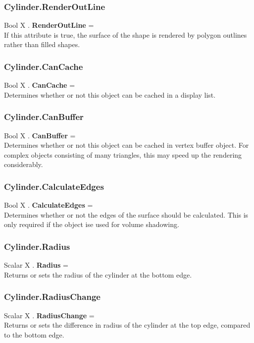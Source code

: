 \subsubsection{Cylinder.RenderOutLine \label{F:Cylinder:RenderOutLine}}
Bool X . \textbf{RenderOutLine} = \\
If this attribute is true, the surface of the shape is rendered by polygon outlines rather than filled shapes.

\subsubsection{Cylinder.CanCache \label{F:Cylinder:CanCache}}
Bool X . \textbf{CanCache} = \\
Determines whether or not this object can be cached in a display list.

\subsubsection{Cylinder.CanBuffer \label{F:Cylinder:CanBuffer}}
Bool X . \textbf{CanBuffer} = \\
Determines whether or not this object can be cached in vertex buffer object. For complex objects consisting of many triangles, this may speed up the rendering considerably.

\subsubsection{Cylinder.CalculateEdges \label{F:Cylinder:CalculateEdges}}
Bool X . \textbf{CalculateEdges} = \\
Determines whether or not the edges of the surface should be calculated. This is only required if the object ise used for volume shadowing.

\subsubsection{Cylinder.Radius \label{F:Cylinder:Radius}}
Scalar X . \textbf{Radius} = \\
Returns or sets the radius of the cylinder at the bottom edge.

\subsubsection{Cylinder.RadiusChange \label{F:Cylinder:RadiusChange}}
Scalar X . \textbf{RadiusChange} = \\
Returns or sets the difference in radius of the cylinder at the top edge, compared to the bottom edge.


